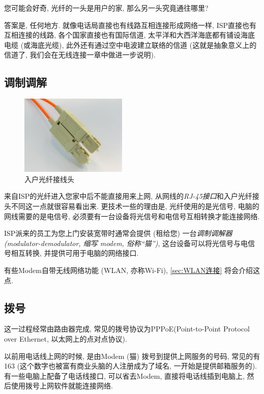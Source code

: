 您可能会好奇, 光纤的一头是用户的家, 那么另一头究竟通往哪里?

答案是, 任何地方. 就像电话局直接也有线路互相连接形成网络一样, ISP直接也有互相连接的线路, 各个国家直接也有国际信道, 太平洋和大西洋海底都有铺设海底电缆 (或海底光缆), 此外还有通过空中电波建立联络的信道 (这就是抽象意义上的信道了, 我们会在无线连接一章中做进一步说明).

\subsection{调制调解}

\begin{figure}[htbp]
    \centering
    \includegraphics[width=2in]{media/SC-optical-fiber-connector-hdr-0a.jpg}
    \caption{入户光纤接线头
    \cite{OpticalFiberConnector}
    }
\end{figure}

来自ISP的光纤进入您家中后不能直接用来上网, 从网线的\textit{RJ-45接口}和入户光纤接头不同这一点就很容易看出来. 更技术一些的理由是, 光纤使用的是光信号, 电脑的网线需要的是电信号, 必须要有一台设备将光信号和电信号互相转换才能连接网络.

ISP派来的员工为您上门安装宽带时通常会提供 (租给您) 一台\textit{调制调解器 (modulator-demodulator, 缩写 modem, 俗称``猫'')}, 这台设备可以将光信号与电信号相互转换, 并提供可用于电脑的网络接口.

有些Modem自带无线网络功能 (WLAN, 亦称Wi-Fi), \autoref*{sec:WLAN连接} 将会介绍这点.



\subsection{拨号}

这一过程经常由路由器完成, 常见的拨号协议为PPPoE(Point-to-Point Protocol over Ethernet, 以太网上的点对点协议).

以前用电话线上网的时候, 是由Modem (猫) 拨号到提供上网服务的号码, 常见的有 163 (这个数字也被富有商业头脑的人注册成为了域名, 一开始是提供邮箱服务的). 有一些电脑上配备了电话线接口, 可以省去Modem, 直接将电话线插到电脑上, 然后使用拨号上网软件就能连接网络.

